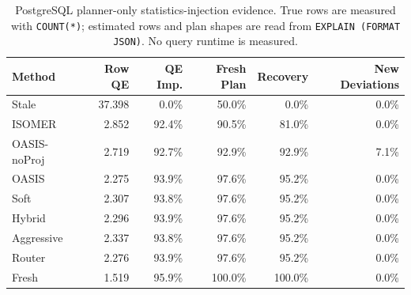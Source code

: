 \begin{table}[t]
  \centering
  \small
  \caption{PostgreSQL planner-only statistics-injection evidence. True rows are measured with \texttt{COUNT(*)}; estimated rows and plan shapes are read from \texttt{EXPLAIN (FORMAT JSON)}. No query runtime is measured.}
  \label{tab:postgres_planner_stats_injection}
  \setlength{\tabcolsep}{4pt}
  \begin{tabular}{lrrrrr}
    \toprule
    Method & Row QE & QE Imp. & Fresh Plan & Recovery & New Deviations \\
    \midrule
    Stale & 37.398 & 0.0\% & 50.0\% & 0.0\% & 0.0\% \\
    ISOMER & 2.852 & 92.4\% & 90.5\% & 81.0\% & 0.0\% \\
    OASIS-noProj & 2.719 & 92.7\% & 92.9\% & 92.9\% & 7.1\% \\
    OASIS & 2.275 & 93.9\% & 97.6\% & 95.2\% & 0.0\% \\
    Soft & 2.307 & 93.8\% & 97.6\% & 95.2\% & 0.0\% \\
    Hybrid & 2.296 & 93.9\% & 97.6\% & 95.2\% & 0.0\% \\
    Aggressive & 2.337 & 93.8\% & 97.6\% & 95.2\% & 0.0\% \\
    Router & 2.276 & 93.9\% & 97.6\% & 95.2\% & 0.0\% \\
    Fresh & 1.519 & 95.9\% & 100.0\% & 100.0\% & 0.0\% \\
    \bottomrule
  \end{tabular}
\end{table}

